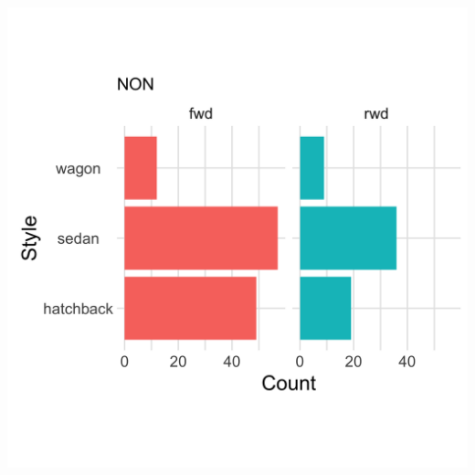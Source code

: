 \documentclass[]{article}
\newcommand{\setwidth}{0.40\textwidth}
\begin{document}
\begin{minipage}{\setwidth}
  \centering
  \includegraphics[width=1.00\textwidth]{../images/02_nonaligned_scale}
\end{minipage}
\hspace*{\fill}

\noindent\hrulefill
\end{document}
